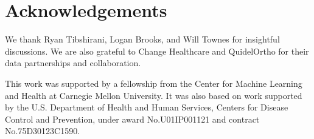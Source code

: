 \section{Acknowledgements}
We thank Ryan Tibshirani, Logan Brooks, and Will Townes for insightful discussions. We are also grateful to Change Healthcare and QuidelOrtho for their data partnerships and collaboration.

This work was supported by a fellowship from the Center for Machine Learning and Health at Carnegie Mellon University. It was also based on work supported by the U.S. Department of Health and Human Services, Centers for Disease Control and Prevention, under award No.U01IP001121 and contract No.75D30123C1590.


